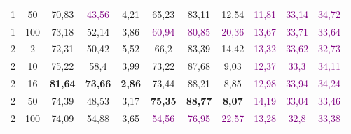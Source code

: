 \begin{table}[ht]
\begin{tabular}{cc|ccc|ccc|ccc}
        {1}                           & {50}   & {70,83}                             & \textcolor{purple}{43,56}           & {4,21}                                   & {65,23}                   & {83,11}                   & {12,54}                   & \textcolor{purple}{11,81} & \textcolor{purple}{33,14} & \textcolor{purple}{34,72} \\
        {1}                           & {100}  & {73,18}                             & {52,14}                             & {3,86}                                   & \textcolor{purple}{60,94} & \textcolor{purple}{80,85} & \textcolor{purple}{20,36} & \textcolor{purple}{13,67} & \textcolor{purple}{33,71} & \textcolor{purple}{33,64} \\
        {2}                           & {2}    & {72,31}                             & {50,42}                             & {5,52}                                   & {66,2}                    & {83,39}                   & {14,42}                   & \textcolor{purple}{13,32} & \textcolor{purple}{33,62} & \textcolor{purple}{32,73} \\
        {2}                           & {10}   & {75,22}                             & {58,4}                              & {3,99}                                   & {73,22}                   & {87,68}                   & {9,03}                    & \textcolor{purple}{12,37} & \textcolor{purple}{33,3}  & \textcolor{purple}{34,11} \\
        {2}                           & {16}   & {\textbf{81,64}}                    & {\textbf{73,66}}                    & {\textbf{2,86}}                          & {73,44}                   & {88,21}                   & {8,85}                    & \textcolor{purple}{12,98} & \textcolor{purple}{33,94} & \textcolor{purple}{34,24} \\
        {2}                           & {50}   & {74,39}                             & {48,53}                             & {3,17}                                   & {\textbf{75,35}}          & \textbf{88,77}            & \textbf{8,07}             & \textcolor{purple}{14,19} & \textcolor{purple}{33,04} & \textcolor{purple}{33,46} \\
        {2}                           & {100}  & {74,09}                             & {54,88}                             & {3,65}                                   & \textcolor{purple}{54,56} & \textcolor{purple}{76,95} & \textcolor{purple}{22,57} & \textcolor{purple}{13,28} & \textcolor{purple}{32,8}  & \textcolor{purple}{33,38} \\

\end{tabular}
\end{table}
